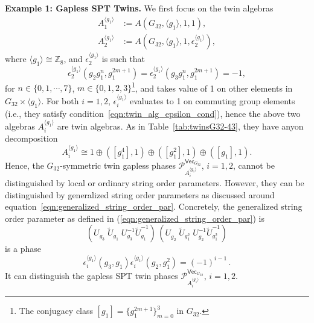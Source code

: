 \documentclass[aps,twocolumn,prx,floatfix,preprintnumbers, nofootinbib,10pt]{revtex4-2}
\numberwithin{equation}{section}
\theoremstyle{definition}
\newcommand{\be}{\begin{equation}}
\newcommand{\ee}{\end{equation}}
\newcommand{\wt}{\widetilde}
\newcommand{\Z}{{\mathbb Z}}
\newcommand{\cP}{\mathcal{P}}
\renewcommand{\Vec}{\mathsf{Vec}}
\begin{document}
\vspace{2mm}
\noindent\textbf{Example 1: Gapless SPT Twins.} We first focus on the twin algebras
\begin{align}
    A_1^{\langle g_1\rangle} & :=A(G_{32},\langle g_1\rangle,1,1), \\
    A_2^{\langle g_1\rangle} & :=A(G_{32},\langle g_1\rangle,1,\epsilon^{\langle g_1\rangle}_2),
\end{align}
where $\langle g_1 \rangle \cong \Z_8$, and $\epsilon^{\langle g_1\rangle}_2$ is such that
\be
\label{eqn:G32,43esp_2^g1}
    \epsilon^{\langle g_1\rangle}_2(g_2g_1^{n}, g_1^{2m+1})=\epsilon^{\langle g_1\rangle}_2(g_3g_1^{n}, g_1^{2m+1}) = -1,
\ee
for $n\in \{0,1,\cdots, 7\}$, $m\in \{0,1,2,3\}$\footnote{The conjugacy class $[g_1]=\{g_1^{2m+1}\}_{m=0}^{3}$ in $G_{32}$.}, and takes value of 1 on other elements in $G_{32}\times \langle g_1\rangle$. For both $i=1,2$, $\epsilon_i^{\langle g_1\rangle}$ evaluates to 1 on commuting group elements (i.e., they satisfy condition~\eqref{eqn:twin_alg_epsilon_cond}), hence the above two algebras $A_i^{\langle g_1\rangle}$ are twin algebras. As in Table~\ref{tab:twinsG32-43}, they have anyon decomposition
\be
    A_i^{\langle g_1\rangle} \cong 1 \oplus ([g_1^4],1) \oplus ([g_1^2], 1) \oplus ([g_1],1).
\ee
Hence, the $G_{32}$-symmetric twin gapless phases $\cP^{\Vec_{G_{32}}}_{A_i^{\langle g_1 \rangle}}$, $i=1,2$, cannot be distinguished by local or ordinary string order parameters. However, they can be distinguished by generalized string order parameters as discussed around equation~\eqref{eqn:generalized_string_order_par}. %
Concretely, the generalized string order parameter as defined in (\ref{eqn:generalized_string_order_par}) is 
\be
      (U_{g_3}^{\phantom{-1}}\!\!\wt{U}_{g_1}^{\phantom{-1}}\!\!U_{g_3}^{-1}\wt{U}_{g_1}^{-1})\,
     (U_{g_2^{\phantom{2}}}^{\phantom{-1}}\!\!\wt{U}_{g_1^2}^{\phantom{-1}}\!U_{g_2^{\phantom{2}}}^{-1}\wt{U}_{g_1^2}^{-1}) 
\ee
is a phase 
\be
    \epsilon_i^{\langle g_1\rangle}(g_3, g_1)\epsilon_i^{\langle g_1\rangle}(g_2, g_1^2) = (-1)^{i-1}\,.
\ee
It can distinguish the gapless SPT twin phases $\cP^{\Vec_{G_{32}}}_{A_i^{\langle g_1\rangle}}$, $i=1,2$.
\end{document}
